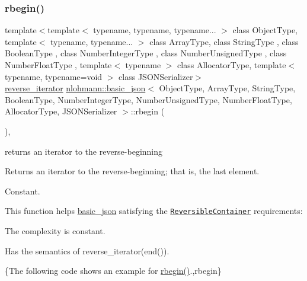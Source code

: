 \subsubsection{\texorpdfstring{rbegin()}{rbegin()}\hspace{0.1cm}{\footnotesize\ttfamily [1/2]}}
{\footnotesize\ttfamily template$<$template$<$ typename, typename, typename... $>$ class Object\+Type, template$<$ typename, typename... $>$ class Array\+Type, class String\+Type , class Boolean\+Type , class Number\+Integer\+Type , class Number\+Unsigned\+Type , class Number\+Float\+Type , template$<$ typename $>$ class Allocator\+Type, template$<$ typename, typename=void $>$ class J\+S\+O\+N\+Serializer$>$ \\
\hyperlink{classnlohmann_1_1basic__json_ac223d5560c2b05a208c88de67376c5f2}{reverse\+\_\+iterator} \hyperlink{classnlohmann_1_1basic__json}{nlohmann\+::basic\+\_\+json}$<$ Object\+Type, Array\+Type, String\+Type, Boolean\+Type, Number\+Integer\+Type, Number\+Unsigned\+Type, Number\+Float\+Type, Allocator\+Type, J\+S\+O\+N\+Serializer $>$\+::rbegin (\begin{DoxyParamCaption}{ }\end{DoxyParamCaption})\hspace{0.3cm}{\ttfamily [inline]}, {\ttfamily [noexcept]}}



returns an iterator to the reverse-\/beginning 

Returns an iterator to the reverse-\/beginning; that is, the last element.

  Constant.

This function helps {\ttfamily \hyperlink{classnlohmann_1_1basic__json}{basic\+\_\+json}} satisfying the \href{http://en.cppreference.com/w/cpp/concept/ReversibleContainer}{\tt Reversible\+Container} requirements\+:
\begin{DoxyItemize}
\item The complexity is constant.
\item Has the semantics of {\ttfamily reverse\+\_\+iterator(end())}.
\end{DoxyItemize}

\{The following code shows an example for {\ttfamily \hyperlink{classnlohmann_1_1basic__json_a1ef93e2006dbe52667294f5ef38b0b10}{rbegin()}}.,rbegin\}

